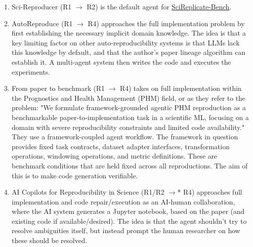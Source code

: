\documentclass[8pt,a4paper]{article}
\begin{document}
\begin{enumerate}
        \hyperref[itm:paperreprodesc]{PaperRepro by Zhang et al.}\cite{paperrepro}.
        The system attempts to solve the paper to code problem through distinct stages.
        The first stage builds and prunes the citation graph, in order to surface necessary tacit knowledge.
        The next stage uses the paper and surfaced tacit knowledge to create the code implementation, 
        through execution-feedback refinement.
    \item Sci-Reproducer\cite[pages~6--7]{scireplicatebench} (R1 $\rightarrow$ R2)
        \subitem is the default agent for \hyperref[itm:scireplicatebenchdesc]{SciReplicate-Bench}\cite{scireplicatebench}.
    \item AutoReproduce\cite{autoreproduce}\label{itm:autoreproducedesc} (R1 $\rightarrow$ R4)
        \subitem approaches the full implementation problem by first establishing the necessary implicit domain knowledge. 
        The idea is that a key limiting factor on other auto-reproducibility systems is that LLMs lack this knowledge by default, 
        and that the author's paper lineage algorithm can establish it. A multi-agent system then writes the code and executes the experiments.
    \item From paper to benchmark\cite{theiler2026} (R1 $\rightarrow$ R4)
        \subitem takes on full implementation within the Prognostics and Health Management (PHM) field, or as they refer to the problem:
        "We formulate framework-grounded agentic
        PHM reproduction as a benchmarkable paper-to-implementation task in a scientific ML, focusing
        on a domain with severe reproducibility constraints and limited code availability." \citep[page~2]{theiler2026}
        They use a framework-coupled agent workflow. The framework in question provides fixed task contracts, dataset adapter interfaces, transformation operations,
        windowing operations, and metric definitions. These are benchmark conditions that are held fixed across all reproductions.
        The aim of this is to make code generation verifiable.
    \item AI Copilots for Reproducibility in Science\cite{bibal2025} (R1/R2 $\rightarrow$* R4) %
        \subitem approaches full implementation and code repair/execution as an AI-human collaboration, 
            where the AI system generates a Jupyter notebook, based on the paper (and existing code if available/desired).
            The idea is that the agent shouldn't try to resolve ambiguities itself, 
            but instead prompt the human researcher on how these should be resolved.

\end{enumerate}
\end{document}
